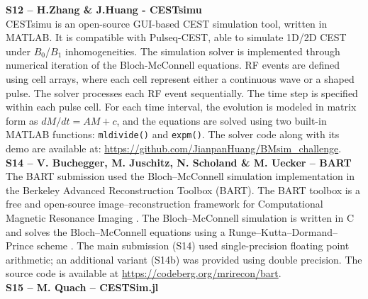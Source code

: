 \documentclass[11pt,a4paper]{article}
\begin{document}
\noindent\textbf{S12 -- H.Zhang \& J.Huang - CESTsimu}\\
CESTsimu is an open-source GUI-based CEST simulation tool, written in MATLAB. It is compatible with Pulseq-CEST, able to simulate 1D/2D CEST under $B_0$/$B_1$ inhomogeneities. 
The simulation solver is implemented through numerical iteration of the Bloch-McConnell equations. 
RF events are defined using cell arrays, where each cell represent either a continuous wave or a shaped pulse. The solver processes each RF event sequentially. 
The time step is specified within each pulse cell. For each time interval, the evolution is modeled in matrix form as $dM/dt=AM+c$, and the equations are solved using two built-in MATLAB functions: \verb|mldivide()| and \verb|expm()|. The solver code along with its demo are available at: \url{https://github.com/JianpanHuang/BMsim_challenge}.\\


\noindent\textbf{S14 -- V. Buchegger, M. Juschitz, N. Scholand \& M. Uecker -- BART}\\
The BART submission used the Bloch--McConnell simulation implementation in the Berkeley Advanced Reconstruction Toolbox (BART). The BART toolbox is a free and open-source image--reconstruction framework for Computational Magnetic Resonance Imaging \cite{Blumenthal2026}. The Bloch--McConnell simulation is written in C and solves the Bloch--McConnell equations using a Runge--Kutta--Dormand--Prince scheme \cite{Scholand2023}. The main submission (S14) used single-precision floating point arithmetic; an additional variant (S14b) was provided using double precision. The source code is available at \url{https://codeberg.org/mrirecon/bart}.\\

\noindent\textbf{S15 -- M. Quach -- CESTSim.jl}
\end{document}
